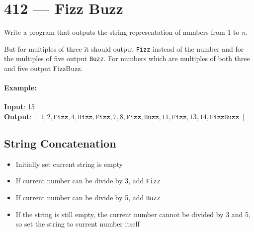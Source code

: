 \section{412 --- Fizz Buzz}
Write a program that outputs the string representation of numbers from 1 to $ n $.
\par
But for multiples of three it should output \texttt{Fizz} instead of the number and for the multiples of five output \texttt{Buzz}. For numbers which are multiples of both three and five output FizzBuzz.

\paragraph{Example:}
\begin{flushleft}
\textbf{Input}: 15
\\
\textbf{Output}: $[\;1,2,\texttt{Fizz}, 4, \texttt{Bizz}, \texttt{Fizz}, 7, 8, \texttt{Fizz}, \texttt{Buzz}, 11, \texttt{Fizz}, 13, 14, \texttt{FizzBuzz}\;]$
\end{flushleft}

\subsection{String Concatenation}
\begin{itemize}
\item Initially set current string is empty
\item If current number can be divide by 3, add \texttt{Fizz}
\item If current number can be divide by 5, add \texttt{Buzz}
\item If the string is still empty, the current number cannot be divided by 3 and 5, so set the string to current number itself
\end{itemize}